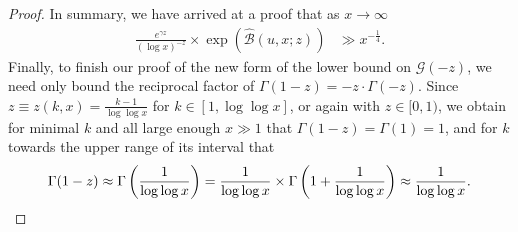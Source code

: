 \documentclass[11pt,reqno,a4letter]{article}
\numberwithin{figure}{section}
\numberwithin{table}{section}
\theoremstyle{plain}
\numberwithin{theorem}{section}
\theoremstyle{definition}
\begin{document}
\begin{proof}
In summary, we have arrived at a proof that 
as $x \rightarrow \infty$
\begin{align} 
\label{eqn_proof_tag_simpl_v1} 
\frac{e^{\gamma z}}{(\log x)^{-z}} \times \exp\left(\widehat{\mathcal{B}}(u, x; z)\right) & \gg 
     x^{-\frac{1}{4}}. 
\end{align} 
Finally, to finish our proof of the new form of the lower bound on $\mathcal{G}(-z)$, 
we need only bound the reciprocal factor of $\Gamma(1-z) = -z \cdot \Gamma(-z)$. 
Since $z \equiv z(k, x) = \frac{k-1}{\log\log x}$ for 
$k \in [1, \log\log x]$, or again with $z \in [0, 1)$, 
we obtain for minimal $k$ and all large enough $x \gg 1$ that 
$\Gamma(1-z) = \Gamma(1) = 1$, and for $k$ towards the upper range of 
its interval that 
\[
\Gamma(1-z) \approx \Gamma\left(\frac{1}{\log\log x}\right) = 
     \frac{1}{\log\log x} \times \Gamma\left(1 + \frac{1}{\log\log x}\right) 
     \approx \frac{1}{\log\log x}. 
     \qedhere 
\]
\end{proof} 
\end{document}
